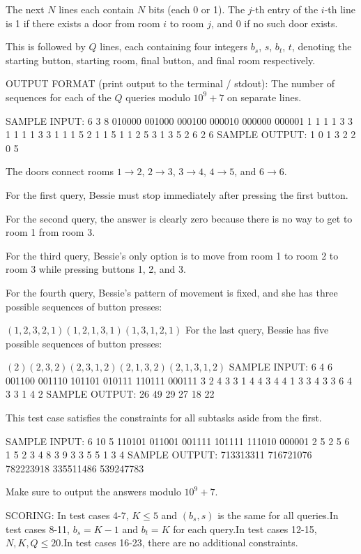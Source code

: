 \documentclass[12pt]{article}
\begin{document}
The next $N$ lines each contain $N$ bits (each 0 or 1). The $j$-th entry of the
$i$-th line is 1 if there exists a door from room $i$ to room $j$, and 0 if no
such door exists.

This is followed by $Q$ lines, each containing four integers $b_s$, $s$, $b_t$,
$t$, denoting the starting button, starting room, final button, and final room
respectively.

OUTPUT FORMAT (print output to the terminal / stdout):
The number of sequences for each of the $Q$ queries modulo $10^9+7$ on separate
lines.

SAMPLE INPUT:
6 3 8
010000
001000
000100
000010
000000
000001
1 1 1 1
3 3 1 1
1 1 3 3
1 1 1 5
2 1 1 5
1 1 2 5
3 1 3 5
2 6 2 6
SAMPLE OUTPUT: 
1
0
1
3
2
2
0
5

The doors connect rooms $1\to 2$, $2 \to 3$, $3\to 4$, $4\to 5$, and $6\to 6$.

For the first query, Bessie must stop immediately after pressing the first
button.

For the second query, the answer is clearly zero because there is no way to get
to room 1 from room 3.

For the third query, Bessie's only option is to move from room 1 to room 2 to
room 3 while pressing buttons 1, 2, and 3.

For the fourth query, Bessie's pattern of movement is fixed, and she has three
possible sequences of button presses:

$(1,2,3,2,1)$$(1,2,1,3,1)$$(1,3,1,2,1)$
For the last query, Bessie has five possible sequences of button presses:

$(2)$$(2,3,2)$$(2,3,1,2)$$(2,1,3,2)$$(2,1,3,1,2)$
SAMPLE INPUT:
6 4 6
001100
001110
101101
010111
110111
000111
3 2 4 3
3 1 4 4
3 4 4 1
3 3 4 3
3 6 4 3
3 1 4 2
SAMPLE OUTPUT: 
26
49
29
27
18
22

This test case satisfies the constraints for all subtasks aside from the first.

SAMPLE INPUT:
6 10 5
110101
011001
001111
101111
111010
000001
2 5 2 5
6 1 5 2
3 4 8 3
9 3 3 5
5 1 3 4
SAMPLE OUTPUT: 
713313311
716721076
782223918
335511486
539247783

Make sure to output the answers modulo $10^9+7$.

SCORING:
In test cases 4-7, $K\le 5$ and $(b_s,s)$ is the same for all queries.In test cases 8-11, $b_s=K-1$ and $b_t=K$ for each query.In test cases 12-15, $N,K,Q\le 20$.In test cases 16-23, there are no additional constraints.
\end{document}
